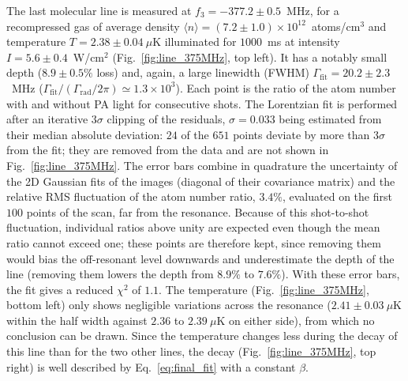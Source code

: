 The last molecular line is measured at $f_3=-377.2\pm0.5$~MHz, for a
recompressed gas of average density $\langle n\rangle = (7.2\pm1.0)\times10^{12}$~atoms/cm$^3$
and temperature $T=2.38\pm0.04~\mu$K illuminated for $1000$~ms at intensity $I=5.6\pm0.4$~W/cm$^2$
(Fig.~\ref{fig:line_375MHz}, top left). It has a notably small depth ($8.9\pm0.5\%$
loss) and, again, a large linewidth (FWHM) $\Gamma_{\text{fit}}=20.2\pm2.3$~MHz
($\Gamma_{\text{fit}}/(\Gamma_{\text{rad}}/2\pi) \simeq 1.3\times10^3$). Each point is the ratio of
the atom number with and without PA light for consecutive shots. The Lorentzian fit is
performed after an iterative $3\sigma$ clipping of the residuals, $\sigma = 0.033$ being
estimated from their median absolute deviation: $24$ of the $651$ points deviate by more
than $3\sigma$ from the fit; they are removed from the data and are not shown in
Fig.~\ref{fig:line_375MHz}. The error bars combine in quadrature the uncertainty of the
2D Gaussian fits of the images (diagonal of their covariance matrix) and the relative
RMS fluctuation of the atom number ratio, $3.4\%$, evaluated on the first $100$ points
of the scan, far from the resonance. Because of this shot-to-shot fluctuation, individual
ratios above unity are expected even though the mean ratio cannot exceed one; these points
are therefore kept, since removing them would bias the off-resonant level downwards and
underestimate the depth of the line (removing them lowers the depth from $8.9\%$ to
$7.6\%$). With these error bars, the fit gives a reduced $\chi^2$ of $1.1$.
The temperature (Fig.~\ref{fig:line_375MHz}, bottom left) only shows negligible variations
across the resonance ($2.41\pm0.03~\mu$K within the half width against $2.36$ to
$2.39~\mu$K on either side), from which no conclusion can be drawn. Since the temperature
changes less during the decay of this line than for the two other lines, the decay (Fig.~\ref{fig:line_375MHz}, top right) is well
described by Eq.~\ref{eq:final_fit} with a constant
$\beta$.

